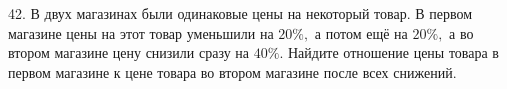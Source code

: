 42. В двух магазинах были одинаковые цены на некоторый товар. В первом магазине цены на этот товар уменьшили на $20\%,$ а потом ещё на $20\%,$ а во втором магазине цену снизили сразу на  $40\%.$ Найдите отношение цены товара в первом магазине к цене товара во втором магазине после всех снижений.\\
